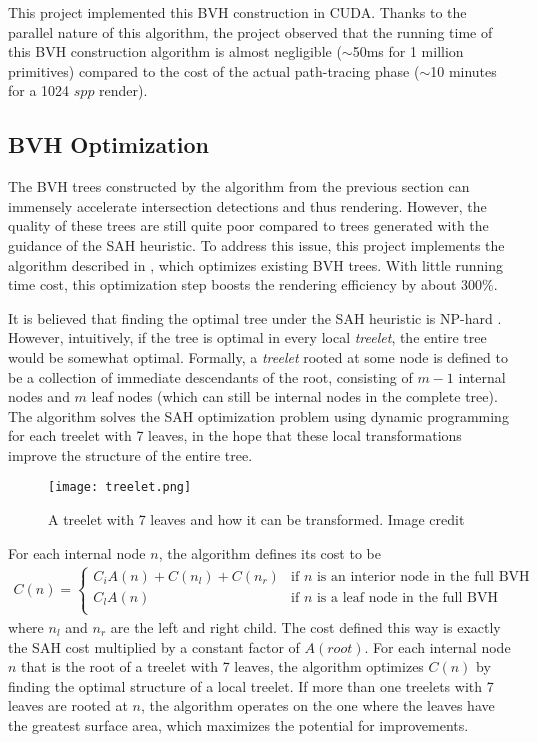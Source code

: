 
This project implemented this BVH construction in CUDA. Thanks to the parallel nature of this algorithm, the project observed that the running time of this BVH construction algorithm is almost negligible ($\sim$50ms for 1 million primitives) compared to the cost of the actual path-tracing phase ($\sim$10 minutes for a 1024 $spp$ render).


\subsection{BVH Optimization}
The BVH trees constructed by the algorithm from the previous section can immensely accelerate intersection detections and thus rendering. However, the quality of these trees are still quite poor compared to trees generated with the guidance of the SAH heuristic. To address this issue, this project implements the algorithm described in \cite{bvh_optimize}, which optimizes existing BVH trees. With little running time cost, this optimization step boosts the rendering efficiency by about $300\%$.

It is believed that finding the optimal tree under the SAH heuristic is NP-hard \cite{bvh_optimize}. However, intuitively, if the tree is optimal in every local \textit{treelet}, the entire tree would be somewhat optimal. Formally, a \textit{treelet} rooted at some node is defined to be a collection of immediate descendants of the root, consisting of $m-1$ internal nodes and $m$ leaf nodes (which can still be internal nodes in the complete tree). The algorithm solves the SAH optimization problem using dynamic programming for each treelet with 7 leaves, in the hope that these local transformations improve the structure of the entire tree. 

\begin{figure}[H]
    \centering
    \texttt{[image: treelet.png]}
    \caption{A treelet with 7 leaves and how it can be transformed. Image credit \cite{bvh_optimize}}
\end{figure}
For each internal node $n$, the algorithm defines its cost to be 
\begin{align*}
    C(n) = 
    \begin{cases}
        C_i A(n) + C(n_l) + C(n_r) &\text{if $n$ is an interior node in the full BVH}\\
        C_l A(n) &\text{if $n$ is a leaf node in the full BVH}\\
    \end{cases}
\end{align*}
where $n_l$ and $n_r$ are the left and right child. The cost defined this way is exactly the SAH cost multiplied by a constant factor of $A(root)$. For each internal node $n$ that is the root of a treelet with 7 leaves, the algorithm optimizes $C(n)$ by finding the optimal structure of a local treelet. If more than one treelets with 7 leaves are rooted at $n$, the algorithm operates on the one where the leaves have the greatest surface area, which maximizes the potential for improvements. 

